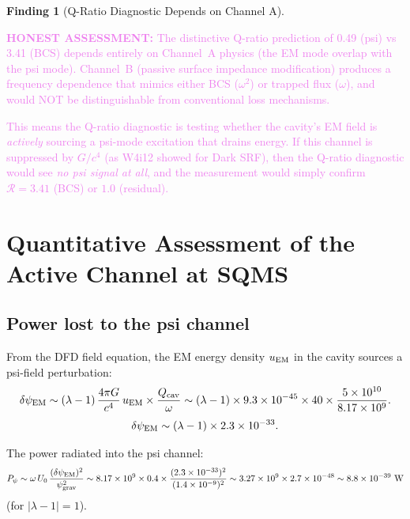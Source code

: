 \documentclass[11pt]{article}
\newcommand{\lam}{\lambda}
\newcommand{\lbone}{|\lambda - 1|}
\newcommand{\ee}[1]{\times 10^{#1}}
\newcommand{\psigrav}{\psi_{\rm grav}}
\newcommand{\dpsiEM}{\delta\psi_{\rm EM}}
\newcommand{\honest}[1]{\textcolor{violet}{\textbf{HONEST ASSESSMENT:} #1}}
\theoremstyle{definition}
\newtheorem{finding}[theorem]{Finding}
\theoremstyle{remark}
\begin{document}
\begin{finding}[Q-Ratio Diagnostic Depends on Channel A]
\label{find:q_ratio_channel}
\honest{The distinctive Q-ratio prediction of 0.49 (psi) vs 3.41 (BCS)
depends entirely on Channel~A physics (the EM mode overlap with the
psi mode). Channel~B (passive surface impedance modification) produces
a frequency dependence that mimics either BCS ($\omega^2$) or trapped
flux ($\omega$), and would NOT be distinguishable from conventional
loss mechanisms.

This means the Q-ratio diagnostic is testing whether the cavity's
EM field is \emph{actively} sourcing a psi-mode excitation that
drains energy. If this channel is suppressed by $G/c^4$ (as W4i12
showed for Dark SRF), then the Q-ratio diagnostic would see
\emph{no psi signal at all}, and the measurement would simply
confirm $\mathcal{R} = 3.41$ (BCS) or $1.0$ (residual).}
\end{finding}


\section{Quantitative Assessment of the Active Channel at SQMS}
\label{sec:active_assessment}

\subsection{Power lost to the psi channel}

From the DFD field equation, the EM energy density $u_{\rm EM}$ in the
cavity sources a psi-field perturbation:
\begin{equation}
\dpsiEM \sim (\lam-1)\,\frac{4\pi G}{c^4}\,u_{\rm EM}
\times\frac{Q_{\rm cav}}{\omega}
\sim (\lam-1)\times 9.3\ee{-45}\times 40
\times\frac{5\ee{10}}{8.17\ee{9}}.
\end{equation}
\begin{equation}
\dpsiEM \sim (\lam-1)\times 2.3\ee{-33}.
\label{eq:dpsi_EM_magnitude}
\end{equation}

The power radiated into the psi channel:
\begin{equation}
P_\psi \sim \omega\,U_0\,\frac{(\dpsiEM)^2}{\psigrav^2}
\sim 8.17\ee{9}\times 0.4\times\frac{(2.3\ee{-33})^2}{(1.4\ee{-9})^2}
\sim 3.27\ee{9}\times 2.7\ee{-48}
\sim 8.8\ee{-39}~\text{W}
\label{eq:P_psi_active}
\end{equation}
(for $\lbone = 1$).
\end{document}
